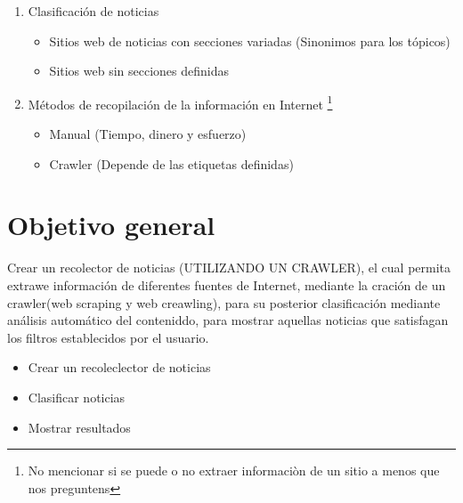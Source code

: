 \begin{enumerate}
	

	\item Clasificación de noticias
	\begin{itemize}
		\item Sitios web de noticias con secciones variadas (Sinonimos para los tópicos)
		\item Sitios web sin secciones definidas
	\end{itemize}
	
	\item  Métodos de recopilación de la información en Internet \footnote{No mencionar si se puede o no extraer informaciòn de un sitio a menos que nos preguntens}

	\begin{itemize}
		\item Manual (Tiempo, dinero y esfuerzo)
		\item Crawler (Depende de las etiquetas definidas)

	\end{itemize}

 

\end{enumerate}

\section{Objetivo general}

  Crear un recolector de noticias (UTILIZANDO UN CRAWLER), el cual permita extrawe información de diferentes fuentes de Internet, mediante la cración de un crawler(web scraping y web creawling), para su posterior clasificación mediante análisis automático del conteniddo, para mostrar aquellas noticias que satisfagan los filtros establecidos por el usuario.

  \begin{itemize}
	\item Crear un recoleclector de noticias
	\item Clasificar noticias
	\item Mostrar resultados
	\end{itemize}


